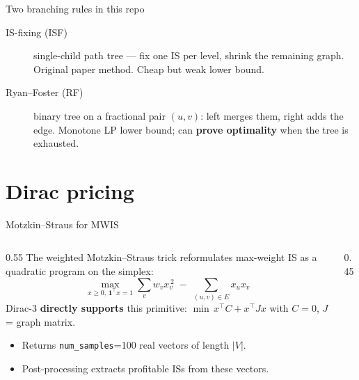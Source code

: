 \documentclass[aspectratio=169,11pt]{beamer}
\newcommand{\bestval}[1]{\textbf{\textcolor{qciteal}{#1}}}
\begin{document}
\begin{frame}{Two branching rules in this repo}
  \begin{description}
    \item[IS-fixing (ISF)] single-child path tree --- fix one IS per level, shrink
          the remaining graph. Original paper method. Cheap but weak lower bound.
    \item[Ryan--Foster (RF)] binary tree on a fractional pair $(u,v)$: left
          merges them, right adds the edge. Monotone LP lower bound; can
          \bestval{prove optimality} when the tree is exhausted.
  \end{description}
\end{frame}

\section{Dirac pricing}

\begin{frame}{Motzkin--Straus for MWIS}
  \begin{columns}[T]
    \begin{column}{0.55\textwidth}
      The weighted Motzkin--Straus trick reformulates max-weight IS as a
      quadratic program on the simplex:
      \[
      \max_{x \ge 0,\,\mathbf{1}^{\!\top}\!x=1} \sum_v w_v x_v^{\,2} \;-\;
      \sum_{(u,v) \in E} x_u x_v
      \]
      Dirac-3 \textbf{directly supports} this primitive:
      $\min\, x^{\top} C + x^{\top} J x$ with $C=0$, $J$ = graph matrix.
      \begin{itemize}\small
        \item Returns \texttt{num\_samples}=100 real vectors of length $|V|$.
        \item Post-processing extracts profitable ISs from these vectors.
      \end{itemize}
    \end{column}
    \begin{column}{0.45\textwidth}
      \centering
    \end{column}
  \end{columns}
\end{frame}
\end{document}

